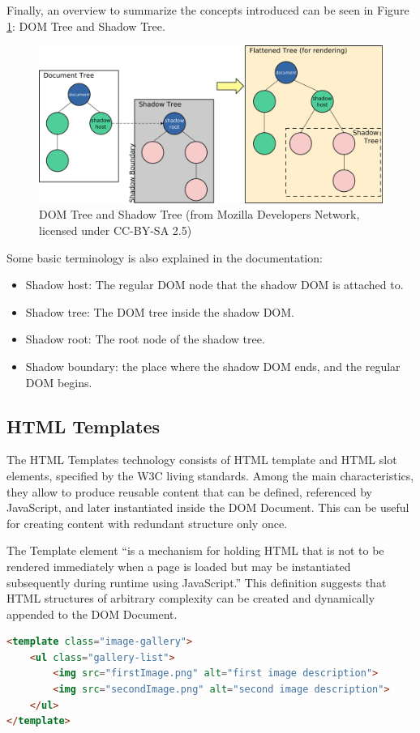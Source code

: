 Finally, an overview to summarize the concepts introduced can be seen in Figure \ref{fig:shadowDom}: DOM Tree and Shadow Tree.

\begin{figure}[H]
\centering
\includegraphics[width=1\textwidth]{images/shadowdom.jpg}
\caption{DOM Tree and Shadow Tree (from Mozilla Developers Network, licensed under CC-BY-SA 2.5)}
\label{fig:shadowDom}
\end{figure}

Some basic terminology is also explained in the documentation:

\begin{itemize}
\item Shadow host: The regular DOM node that the shadow DOM is attached to.
\item Shadow tree: The DOM tree inside the shadow DOM.
\item Shadow root: The root node of the shadow tree.
\item Shadow boundary: the place where the shadow DOM ends, and the regular DOM begins.
\end{itemize}

\subsection{HTML Templates}
\label{subsec:HTMLTemplates}

The HTML Templates technology consists of HTML template and HTML slot elements, specified by the W3C living standards. Among the main characteristics, they allow to produce reusable content that can be defined, referenced by JavaScript, and later instantiated inside the DOM Document. This can be useful for creating content with redundant structure only once.

The Template element “is a mechanism for holding HTML that is not to be rendered immediately when a page is loaded but may be instantiated subsequently during runtime using JavaScript.” This definition suggests that HTML structures of arbitrary complexity can be created and dynamically appended to the DOM Document.
\\
\begin{lstlisting}[caption={HTML Template creation},label={htmlTemplate}, language=HTML]
<template class="image-gallery">
    <ul class="gallery-list">
        <img src="firstImage.png" alt="first image description">
        <img src="secondImage.png" alt="second image description">
    </ul>
</template>
\end{lstlisting}

